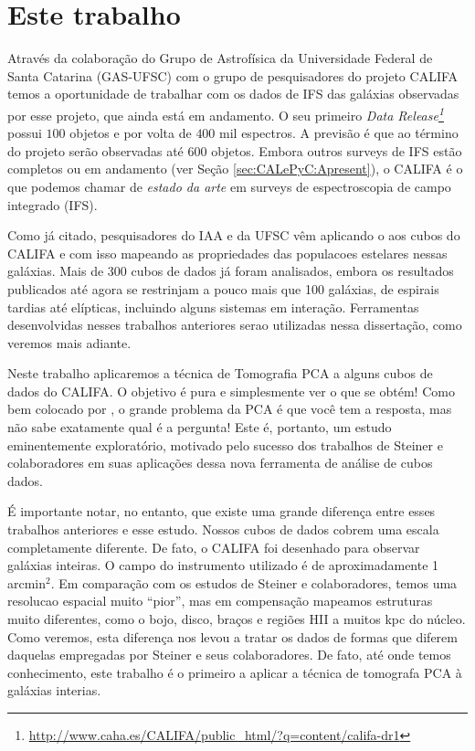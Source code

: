 \section{Este trabalho}
\label{sec:Intro:ThisWork}

Através da colaboração do Grupo de Astrofísica da Universidade Federal de Santa Catarina (GAS-UFSC) com o grupo de
pesquisadores do projeto CALIFA temos a oportunidade de trabalhar com os dados de IFS das galáxias observadas por esse
projeto, que ainda está em andamento. O seu primeiro {\em Data
Release\footnote{\url{http://www.caha.es/CALIFA/public_html/?q=content/califa-dr1}}} \citep[][DR1]{Husemann2013} possui
$100$ objetos e por volta de $400$ mil espectros. A previsão é que ao término do projeto serão observadas até $600$
objetos. Embora outros surveys de IFS estão completos ou em andamento (ver Seção \ref{sec:CALePyC:Apresent}), o CALIFA é
o que podemos chamar de {\em estado da arte} em surveys de espectroscopia de campo integrado (IFS).

Como já citado, pesquisadores do IAA e da UFSC vêm aplicando o \starlight aos cubos do CALIFA e com isso mapeando as
propriedades das populacoes estelares nessas galáxias. Mais de 300 cubos de dados já foram analisados, embora os
resultados publicados até agora se restrinjam a pouco mais que 100 galáxias, de espirais tardias até elípticas,
incluindo alguns sistemas em interação. Ferramentas desenvolvidas nesses trabalhos anteriores serao utilizadas nessa
dissertação, como veremos mais adiante.

Neste trabalho aplicaremos a técnica de Tomografia PCA a alguns cubos de dados do CALIFA. O objetivo é pura e
simplesmente ver o que se obtém! Como bem colocado por \citet{Steiner2009}, o grande problema da PCA é que você tem a
resposta, mas não sabe exatamente qual é a pergunta! Este é, portanto, um estudo eminentemente exploratório, motivado
pelo sucesso dos trabalhos de Steiner e colaboradores em suas aplicações dessa nova ferramenta de análise de cubos
dados.

É importante notar, no entanto, que existe uma grande diferença entre esses trabalhos anteriores e esse estudo.  Nossos
cubos de dados cobrem uma escala completamente diferente. De fato, o CALIFA foi desenhado para observar galáxias
inteiras. O campo do instrumento utilizado é de aproximadamente 1 arcmin$^2$. Em comparação com os estudos de Steiner e
colaboradores, temos uma resolucao espacial muito ``pior'', mas em compensação mapeamos estruturas muito diferentes, como
o bojo, disco, braços e regiões HII a muitos kpc do núcleo. Como veremos, esta diferença nos levou a tratar os dados
de formas que diferem daquelas empregadas por Steiner e seus colaboradores. De fato, até onde temos conhecimento, este
trabalho é o primeiro a aplicar a técnica de tomografa PCA à galáxias interias.

